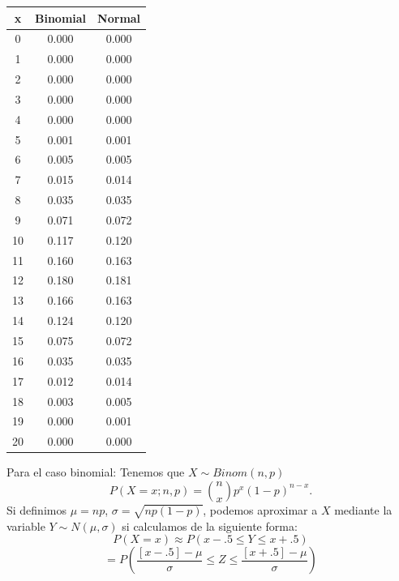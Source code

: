 \documentclass[
  10pt,
  ignorenonframetext,
]{beamer}
\begin{document}
\begin{frame}{}
\protect\hypertarget{section-36}{}
\begin{minipage}{\textwidth}

\begin{multicols}{2}


\begin{table}
\centering\begingroup\fontsize{9}{11}\selectfont

\begin{tabular}{c|c|c}
\hline
x & Binomial & Normal\\
\hline
0 & 0.000 & 0.000\\
\hline
1 & 0.000 & 0.000\\
\hline
2 & 0.000 & 0.000\\
\hline
3 & 0.000 & 0.000\\
\hline
4 & 0.000 & 0.000\\
\hline
5 & 0.001 & 0.001\\
\hline
6 & 0.005 & 0.005\\
\hline
7 & 0.015 & 0.014\\
\hline
8 & 0.035 & 0.035\\
\hline
9 & 0.071 & 0.072\\
\hline
10 & 0.117 & 0.120\\
\hline
11 & 0.160 & 0.163\\
\hline
12 & 0.180 & 0.181\\
\hline
13 & 0.166 & 0.163\\
\hline
14 & 0.124 & 0.120\\
\hline
15 & 0.075 & 0.072\\
\hline
16 & 0.035 & 0.035\\
\hline
17 & 0.012 & 0.014\\
\hline
18 & 0.003 & 0.005\\
\hline
19 & 0.000 & 0.001\\
\hline
20 & 0.000 & 0.000\\
\hline
\end{tabular}
\endgroup{}
\end{table}

Para el caso binomial: Tenemos que $X\sim Binom(n,p)$
$$P(X=x;n,p)= \binom{n}{x}p^x (1-p)^{n-x}.$$
Si definimos $\mu=np$, $\sigma=\sqrt{np(1-p)}$, podemos aproximar a $X$ mediante la variable $Y\sim N(\mu,\sigma)$ si calculamos de la siguiente forma:
$$P(X=x) \approx P(x-.5 \le Y \le x+.5)$$
$$=P\left(\frac{[x-.5] - \mu}{\sigma} \le Z\le \frac{[x+.5]- \mu}{\sigma}\right)$$



\end{multicols}

\end{minipage}
\end{frame}
\end{document}
